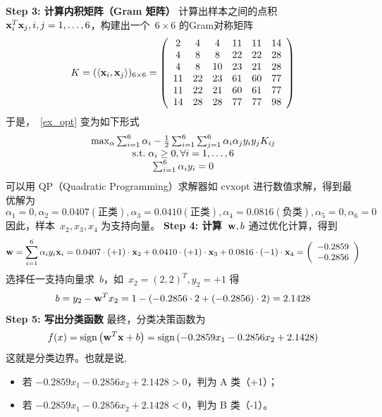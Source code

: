 \vspace{0.5em}
\textbf{Step 3: 计算内积矩阵（Gram 矩阵）}
计算出样本之间的点积~${\bf x}_i^T {\bf x}_j,i,j=1,\dots, 6$，构建出一个~$ 6\times 6$ 的Gram对称矩阵
\[
K =( \langle {\bf x}_i, {\bf x}_j \rangle)_{6\times 6} =
\left(
\begin{array}{cccccc}
2 &  4  & 4 & 11  & 11   &14\\
4 &  8  & 8 & 22 & 22 &28 \\
4 &  8  & 10 & 23& 21&28 \\
11 &  22  &23  & 61& 60& 77 \\
11 & 22  &21 & 60& 61& 77 \\
14 & 28  & 28  &77 & 77 & 98 \\
\end{array} \right)
\]
于是，~\eqref{ex_opt} 变为如下形式
\begin{equation*}
\begin{array}{c}
{\rm max}_{\alpha} \sum_{i=1}^6 \alpha_i -\frac{1}{2} \sum_{i=1}^6 \sum_{j=1}^6 \alpha_i \alpha_j y_i y_j K_{ij} \\
{\rm s.t.} \; \alpha_i \ge 0, \forall i=1, \dots, 6 \\
  \sum_{i=1}^6 \alpha_i y_i =0
  \end{array}
\end{equation*}
可以用 QP（Quadratic Programming）求解器如 cvxopt 进行数值求解，得到最优解为
$$
 \alpha_1 =0,  \alpha_2 =0.0407(\mbox{正类}), \alpha_3 =0.0410(\mbox{正类}) , \alpha_4 =0.0816(\mbox{负类}), \alpha_5 =0, \alpha_6 =0
$$
因此，样本~$x_2,x_3,x_4$ 为支持向量。
\vspace{0.5em}
\textbf{Step 4: 计算~${\bf w},b$}
通过优化计算，得到
$$
{\bf w}= \sum_{i=1}^6 \alpha_i y_i {\bf x}_i = 0.0407\cdot (+1) \cdot {\bf x}_2 +0.0410\cdot (+1) \cdot {\bf x}_3+0.0816\cdot (-1) \cdot {\bf x}_4 = \left(\begin{array}{c} -0.2859 \\ -0.2856\end{array}\right)
$$
选择任一支持向量求~$b$，如~$x_2 = \left( 2,2\right)^T, y_2= +1$ 得
$$
b= y_2 -{\bf w}^T x_2 = 1-(-0.2856\cdot 2 +(-0.2856)\cdot 2) =2.1428
$$
\vspace{0.5em}
\textbf{Step 5: 写出分类函数}
最终，分类决策函数为
\[
f(x) = \text{sign} \left( {\bf w}^T {\bf x}+b \right)= \text{sign}\left(-0.2859x_1 -0.2856 x_2 +2.1428\right)
\]
这就是分类边界。也就是说,
\begin{itemize}
\item 若 $-0.2859x_1 -0.2856 x_2 +2.1428 > 0$，判为 A 类（+1）；
\item 若 $-0.2859x_1 -0.2856 x_2 +2.1428 <  0$，判为 B 类（-1）。
\end{itemize}

